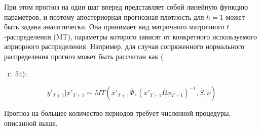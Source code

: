 \documentclass[11pt]{article} %
\newcommand{\eng}[1]{\begin{otherlanguage}{english}#1\end{otherlanguage}}
\begin{document}
При этом прогноз на один шаг вперед представляет собой линейную функцию параметров, и поэтому апостериорная прогнозная плотность для $h=1$ может быть задана аналитически. Она принимает вид матричного матричного $t$-распределения (MT), параметры которого зависят от конкретного используемого априорного распределения.  Например, для случая сопряженного нормального распределения прогноз может быть рассчитан как (\eng{\cite{carriero_al_2015}}~с. 54):

\begin{equation}
y'_{T+1}|x'_{T+1}\sim MT \left(x'_{T+1}\bar\Phi, \left(x'_{T+1}\bar\Omega x_{T+1}\right)^{-1},\bar S,\bar\nu\right)
\end{equation}

Прогноз на большее количество периодов требует численной процедуры, описанной выше.
\end{document}
